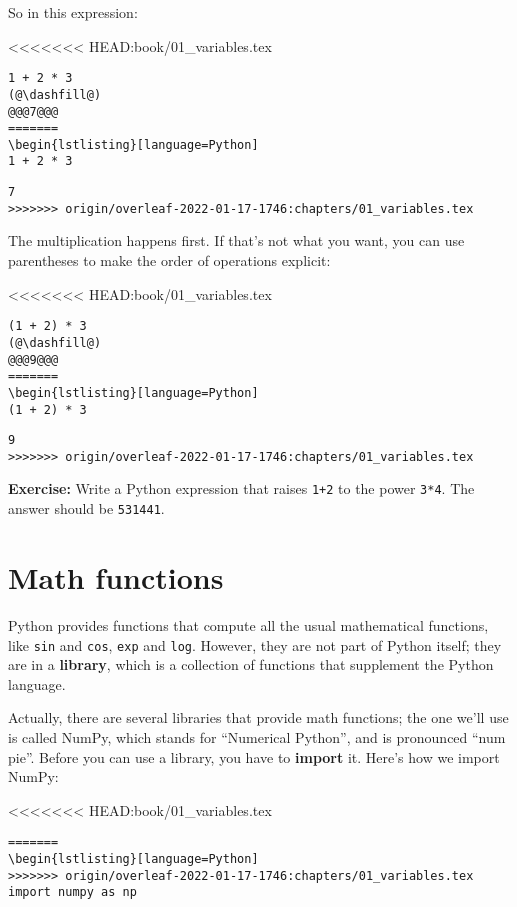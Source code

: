 So in this expression:

<<<<<<< HEAD:book/01_variables.tex
\begin{lstlisting}[]
1 + 2 * 3
(@\dashfill@)
@@@7@@@
=======
\begin{lstlisting}[language=Python]
1 + 2 * 3
\end{lstlisting}

\begin{lstlisting}[]
7
>>>>>>> origin/overleaf-2022-01-17-1746:chapters/01_variables.tex
\end{lstlisting}

The multiplication happens first. If that's not what you want, you can
use parentheses to make the order of operations explicit:

<<<<<<< HEAD:book/01_variables.tex
\begin{lstlisting}[]
(1 + 2) * 3
(@\dashfill@)
@@@9@@@
=======
\begin{lstlisting}[language=Python]
(1 + 2) * 3
\end{lstlisting}

\begin{lstlisting}[]
9
>>>>>>> origin/overleaf-2022-01-17-1746:chapters/01_variables.tex
\end{lstlisting}

\textbf{Exercise:} Write a Python expression that raises
\passthrough{\lstinline!1+2!} to the power
\passthrough{\lstinline!3*4!}. The answer should be
\passthrough{\lstinline!531441!}.

\hypertarget{math-functions}{%
\section{Math functions}\label{math-functions}}

Python provides functions that compute all the usual mathematical
functions, like \passthrough{\lstinline!sin!} and
\passthrough{\lstinline!cos!}, \passthrough{\lstinline!exp!} and
\passthrough{\lstinline!log!}. However, they are not part of Python
itself; they are in a \textbf{library}, which is a collection of
functions that supplement the Python language.

Actually, there are several libraries that provide math functions; the
one we'll use is called NumPy, which stands for ``Numerical Python'',
and is pronounced ``num pie''. Before you can use a library, you have to
\textbf{import} it. Here's how we import NumPy:

<<<<<<< HEAD:book/01_variables.tex
\begin{lstlisting}[]
=======
\begin{lstlisting}[language=Python]
>>>>>>> origin/overleaf-2022-01-17-1746:chapters/01_variables.tex
import numpy as np
\end{lstlisting}

